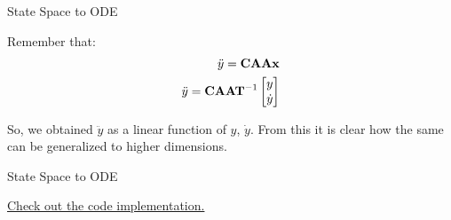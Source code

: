 \documentclass{beamer}
\begin{document}
\begin{frame}{State Space to ODE}
	\begin{flushleft}
		
		Remember that:
		\begin{align}
			\ddot y = \mathbf{C} \mathbf{A} \mathbf{A} \mathbf{x}
			\\
			\ddot y = \mathbf{C} \mathbf{A} \mathbf{A} \mathbf{T}^{-1} 
			\begin{bmatrix}
				y \\ 
				\dot y
			\end{bmatrix}
		\end{align}
		
		So, we obtained $\ddot y$ as a linear function of $y$, $\dot y$.       From this it is clear how the same can be generalized to higher dimensions.
		
	\end{flushleft}
\end{frame}



\begin{frame}{State Space to ODE}
	\begin{flushleft}
		
		\textcolor{blue}{\href{https://github.com/SergeiSa/Control-Theory-Slides-Spring-2022/blob/main/ColabNotebooks/StateSpace2ODE.ipynb}{Check out the code implementation.}}
		
		\bigskip
		
		
		\centerline{\textcolor{black}{}}
		
		
	\end{flushleft}
\end{frame}
\end{document}
